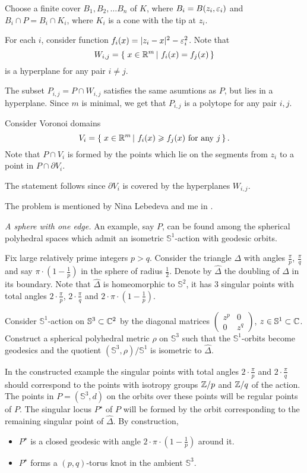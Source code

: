 Choose a finite cover $B_1,B_2,\dots B_n$ of $K$,
where $B_i=B(z_i,\varepsilon_i)$ 
and $B_i\cap P=B_i\cap K_i$, 
where $K_i$ is a cone with the tip at $z_i$.

For each $i$, consider function $f_i(x)=|z_i-x|^2-\varepsilon_i^2$.
Note that
\[W_{i,j}=\set{x\in\RR^m}{f_i(x)=f_j(x)}\]
is a hyperplane for any pair $i\ne j$.

The subset $P_{i,j}=P\cap W_{i,j}$ satisfies the same asumtions as $P$, but lies in a hyperplane.
Since $m$ is minimal, we get that $P_{i,j}$ is a polytope for any pair $i,j$.

Consider Voronoi domains 
\[V_{i}=\set{x\in\RR^m}{f_i(x)\ge f_j(x) \ \text{for any}\ j}.\]
Note that $P\cap V_i$ is formed by the points which lie on the segments from $z_i$ to a point in  $P\cap \partial V_i$.

The statement follows since $\partial V_i$ is covered by the hyperplanes $W_{i,j}$.

The problem is mentioned by Nina Lebedeva and me in \cite{lebedeva-petrunin}.

\textit{A sphere with one edge.}
An example, say $P$, can be found among the spherical polyhedral spaces which admit
an isometric $\mathbb{S}^1$-action with geodesic orbits.

Fix large relatively prime integers $p>q$. 
Consider the triangle $\Delta$ with angles $\tfrac\pi p$, $\tfrac\pi q$ and say $\pi\cdot(1-\tfrac1 p)$ in the sphere of radius $\tfrac12$.
Denote by $\hat \Delta$ the  doubling of $\Delta$ in its boundary.
Note that $\hat \Delta$ is homeomorphic to $\mathbb S^2$,
it has 3 singular points with total angles $2\cdot\tfrac\pi p$,
$2\cdot\tfrac\pi q$ and $2\cdot\pi\cdot(1-\tfrac1 p)$.

Consider $\mathbb S^1$-action on $\mathbb S^3\subset\mathbb{C}^2$ by the diagonal matrices $\left(\begin{smallmatrix}z^p&0\\0&z^q\end{smallmatrix}\right)$, $z\in\mathbb S^1\subset\mathbb{C}$.
Construct a spherical polyhedral metric $\rho$ on  $\mathbb S^3$
such that the $\mathbb S^1$-orbits become geodesics 
and the quotient $(\mathbb S^3,\rho)/\mathbb S^1$
is isometric to $\hat \Delta$.

In the constructed example 
the singular points with total angles $2\cdot\tfrac\pi p$ and
$2\cdot\tfrac\pi q$
should correspond to the points with isotropy groups $\mathbb{Z}/p$ and $\mathbb{Z}/q$ of the action.
The points in $P=(\mathbb{S}^3,d)$ on the orbits over these points will be regular points of $P$.
The singular locus $P^\star$
of $P$ will be formed by the orbit corresponding to the remaining singular point of  $\hat \Delta$.
By construction,
\begin{itemize}
\item $P^\star$ is a closed geodesic with angle $2\cdot\pi\cdot(1-\tfrac1p)$ around it.
\item $P^\star$ forms a $(p,q)$-torus knot in the ambient $\mathbb{S}^3$.
\end{itemize}


